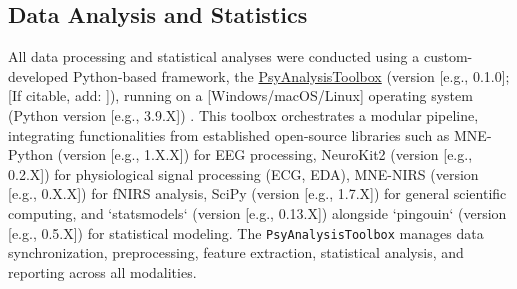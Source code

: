 \subsection{Data Analysis and Statistics}
All data processing and statistical analyses were conducted using a custom-developed Python-based framework, the \href{https://github.com/YourGitHubUser/YourRepoName}{PsyAnalysisToolbox} (version [e.g., 0.1.0]; [If citable, add: \textcite{YourToolboxCitationPlaceholder}]), running on a [Windows/macOS/Linux] operating system (Python version [e.g., 3.9.X]) \parencite{harrisArrayProgrammingNumPy2020, virtanenSciPy10Fundamental2020}. This toolbox orchestrates a modular pipeline, integrating functionalities from established open-source libraries such as MNE-Python (version [e.g., 1.X.X]) \parencite{gramfortMEGEEGData2013} for \gls{EEG} processing, NeuroKit2 (version [e.g., 0.2.X]) \parencite{makowskiNeuroKit2PythonToolbox2021} for physiological signal processing (\gls{ECG}, \gls{EDA}), MNE-NIRS (version [e.g., 0.X.X]) \parencite{yucelBestPracticesFNIRS2021} for \gls{fNIRS} analysis, SciPy (version [e.g., 1.7.X]) \parencite{virtanenSciPy10Fundamental2020} for general scientific computing, and `statsmodels` (version [e.g., 0.13.X]) \parencite{seaboldStatsmodelsEconometricStatistical2010} alongside `pingouin` (version [e.g., 0.5.X]) \parencite{vallatPingouinStatisticsPython2018} for statistical modeling. The \texttt{PsyAnalysisToolbox} manages data synchronization, preprocessing, feature extraction, statistical analysis, and reporting across all modalities.
